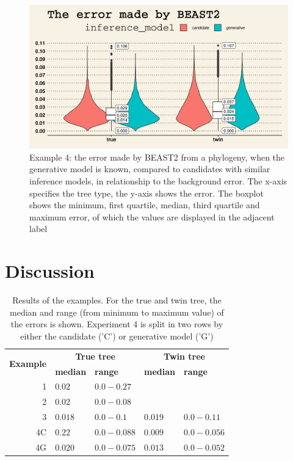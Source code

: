 \documentclass{article}
\begin{document}
\begin{figure}[h]
  \includegraphics[width=\textwidth]{figure_example_4.png}
  \caption{
    Example 4: the error made by BEAST2 from a phylogeny, when the generative model is known, compared to candidates with similar inference models, in relationship to the background error.
    The x-axis specifies the tree type, the y-axis shows the error.
    The boxplot shows the minimum, first quartile, median, third 
    quartile and maximum error, of which the values are displayed 
    in the adjacent label
  }
  \label{fig:example_4}
\end{figure}

\section{Discussion}

\begin{table}[h]
\centering
\begin{tabular}{ | r | l | l | l | l | }
\hline
\multirow{2}{*}{\textbf{Example}} & \multicolumn{2}{c|}{\textbf{True tree}} 
                                  & \multicolumn{2}{c|}{\textbf{Twin tree}} \\
\cline{2-5}
                                  & \textbf{median} & \textbf{range} & \textbf{median} & \textbf{range} \\
\hline
1  & $0.02$  & $0.0 - 0.27$  &         &               \\
2  & $0.02$  & $0.0 - 0.08$  &         &               \\
3  & $0.018$ & $0.0 - 0.1$   & $0.019$ & $0.0 - 0.11$  \\
4C & $0.22$  & $0.0 - 0.088$ & $0.009$ & $0.0 - 0.056$ \\
4G & $0.020$ & $0.0 - 0.075$ & $0.013$ & $0.0 - 0.052$ \\
\hline
\end{tabular}
\caption{Results of the examples. 
  For the true and twin tree,
  the median and range (from minimum to maximum value) of the errors 
  is shown. Experiment 4 is split in two rows
  by either the candidate ('C') or generative model ('G')
}
\label{tab:results}
\end{table}
\end{document}
